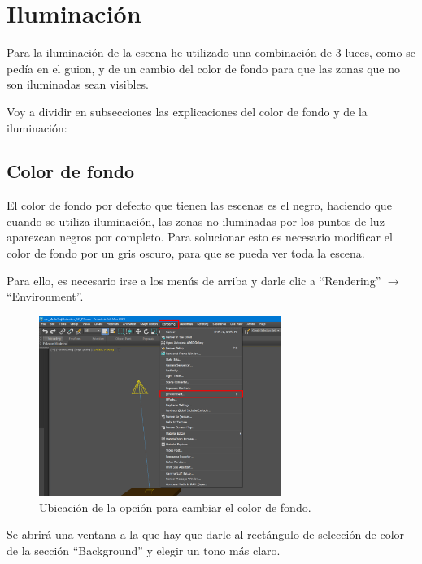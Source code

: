 \section{Iluminación}
Para la iluminación de la escena he utilizado una combinación de 3 luces, como se pedía en el guion, y de un cambio del color de fondo para que las zonas que no son iluminadas sean visibles.

\bigskip

Voy a dividir en subsecciones las explicaciones del color de fondo y de la iluminación:

\subsection{Color de fondo}

El color de fondo por defecto que tienen las escenas es el negro, haciendo que cuando se utiliza iluminación, las zonas no iluminadas por los puntos de luz aparezcan negros por completo. Para solucionar esto es necesario modificar el color de fondo por un gris oscuro, para que se pueda ver toda la escena.

\bigskip

Para ello, es necesario irse a los menús de arriba y darle clic a ``Rendering'' $\rightarrow$ ``Environment''.

\begin{figure}[H]
   \centering
   \includegraphics[width=0.7\textwidth]{imagenes/misc/bg-color1.png}
   \caption{Ubicación de la opción para cambiar el color de fondo.}
\end{figure}

Se abrirá una ventana a la que hay que darle al rectángulo de selección de color de la sección ``Background'' y elegir un tono más claro.

